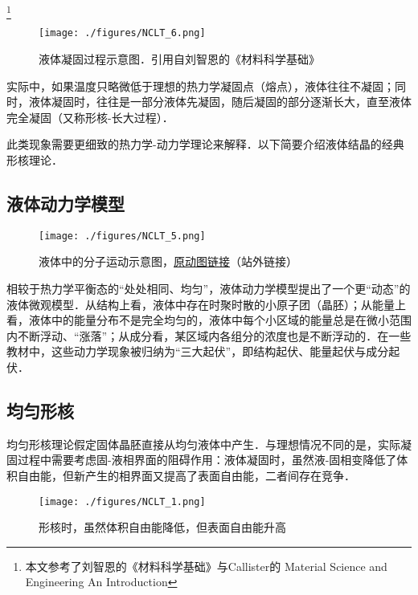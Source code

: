 \footnote{本文参考了刘智恩的《材料科学基础》与Callister的 Material Science and Engineering An Introduction}

\begin{issues}
\issueDraft
{}
\end{issues}

\begin{figure}[ht]
\centering
\texttt{[image: ./figures/NCLT\_6.png]}
\caption{液体凝固过程示意图．引用自刘智恩的《材料科学基础》} \label{NCLT_fig6}
\end{figure}
实际中，如果温度只略微低于理想的热力学凝固点（熔点），液体往往不凝固；同时，液体凝固时，往往是一部分液体先凝固，随后凝固的部分逐渐长大，直至液体完全凝固（又称形核-长大过程）．

此类现象需要更细致的热力学-动力学理论来解释．以下简要介绍液体结晶的经典形核理论．

\subsection{液体动力学模型}
\begin{figure}[ht]
\centering
\texttt{[image: ./figures/NCLT\_5.png]}
\caption{液体中的分子运动示意图，\href{https://chem.libretexts.org/Bookshelves/General_Chemistry/Map\%3A_A_Molecular_Approach_(Tro)/11\%3A_Liquids_Solids_and_Intermolecular_Forces/11.02\%3A_Solids_Liquids_and_Gases-_A_Molecular_Comparison}{原动图链接}（站外链接）} \label{NCLT_fig5}
\end{figure}

相较于热力学平衡态的“处处相同、均匀”，液体动力学模型提出了一个更“动态”的液体微观模型．从结构上看，液体中存在时聚时散的小原子团（晶胚）；从能量上看，液体中的能量分布不是完全均匀的，液体中每个小区域的能量总是在微小范围内不断浮动、“涨落”；从成分看，某区域内各组分的浓度也是不断浮动的．在一些教材中，这些动力学现象被归纳为“三大起伏”，即结构起伏、能量起伏与成分起伏．

\subsection{均匀形核}
均匀形核理论假定固体晶胚直接从均匀液体中产生．与理想情况不同的是，实际凝固过程中需要考虑固-液相界面的阻碍作用：液体凝固时，虽然液-固相变降低了体积自由能，但新产生的相界面又提高了表面自由能，二者间存在竞争．
\begin{figure}[ht]
\centering
\texttt{[image: ./figures/NCLT\_1.png]}
\caption{形核时，虽然体积自由能降低，但表面自由能升高} \label{NCLT_fig1}
\end{figure}

